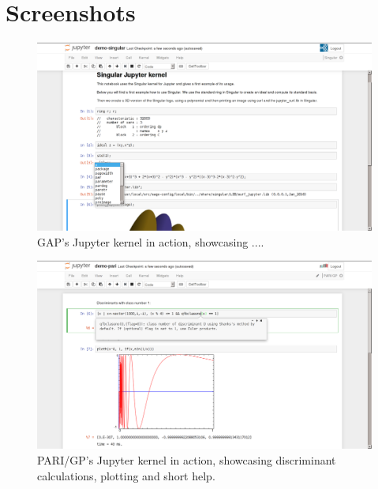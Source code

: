 \documentclass{deliverablereport}
\author{Jeroen Demeyer, Markus Pfeiffer, Nicolas M. Thiéry}
\begin{document}
\maketitle
\githubissuedescription
\tableofcontents
\clearpage
\section{Screenshots}
\begin{figure}[ht]
  \includegraphics[width=140mm,trim={0 0 0 1px},clip]{singular.png}
  \caption{GAP's Jupyter kernel in action, showcasing ....}
\end{figure}
\begin{figure}[ht]
  \includegraphics[width=140mm,trim={0 0 0 1px},clip]{pari.png}
  \caption{PARI/GP's Jupyter kernel in action, showcasing
    discriminant calculations, plotting and short help.}
\end{figure}
\end{document}
